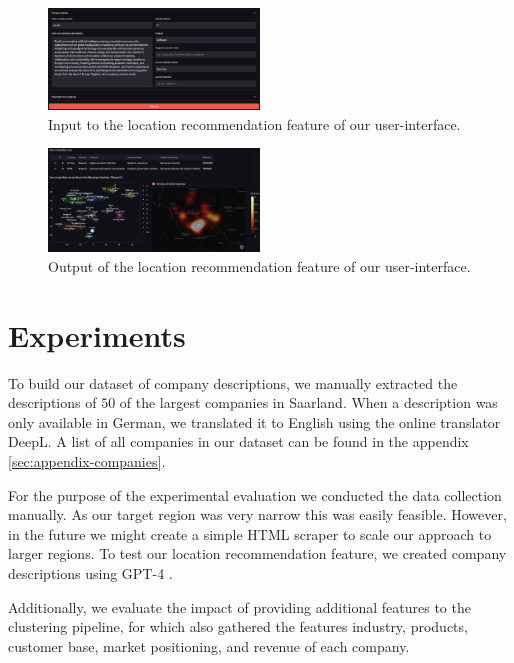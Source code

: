 \documentclass[conference]{IEEEtran}
\begin{document}
\begin{figure}[H]
	\centering
	\includegraphics[width=0.5\textwidth]{figures/location_recommendation_input.png}
	\caption{Input to the location recommendation feature of our user-interface.}
	\label{fig:location-recommendation-input}
\end{figure}
\begin{figure}[H]
	\centering
	\includegraphics[width=0.5\textwidth]{figures/location_recommendation_output.png}
	\caption{Output of the location recommendation feature of our user-interface.}
	\label{fig:location-recommendation-output}
\end{figure}

\section{Experiments}
To build our dataset of company descriptions, we manually extracted the descriptions of $50$ of the largest companies in Saarland. When a description was only available in German, we translated it to English using the online translator DeepL. A list of all companies in our dataset can be found in the appendix \ref{sec:appendix-companies}.

For the purpose of the experimental evaluation we conducted the data collection manually. As our target region was very narrow this was easily feasible. However, in the future we might create a simple HTML scraper to scale our approach to larger regions. To test our location recommendation feature, we created company descriptions using GPT-4 \cite{chatgpt}.

Additionally, we evaluate the impact of providing additional features to the clustering pipeline, for which also gathered the features industry, products, customer base, market positioning, and revenue of each company.
\end{document}
